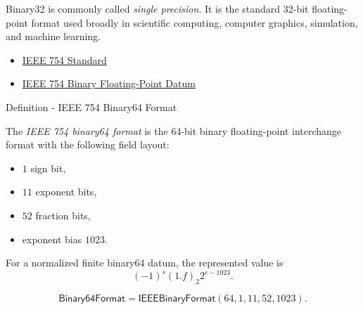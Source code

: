 \begin{remark*}[Interpretation]
Binary32 is commonly called \emph{single precision}. It is the standard 32-bit floating-point
format used broadly in scientific computing, computer graphics, simulation, and machine learning.
\end{remark*}

\begin{remark*}[Exposition]
\end{remark*}

\begin{dependencies}
\begin{itemize}
  \item \hyperref[def:numerical-analysis-ieee-754-standard]{IEEE 754 Standard}
  \item \hyperref[def:numerical-analysis-ieee-754-binary-floating-point-datum]{IEEE 754 Binary Floating-Point Datum}
\end{itemize}
\end{dependencies}


\begin{definitionbox}{Definition - IEEE 754 Binary64 Format}
\begin{definition}
\label{def:numerical-analysis-ieee-754-binary64-format}
The \emph{IEEE 754 binary64 format} is the 64-bit binary floating-point interchange format
with the following field layout:

\begin{itemize}
    \item $1$ sign bit,
    \item $11$ exponent bits,
    \item $52$ fraction bits,
    \item exponent bias $1023$.
\end{itemize}

For a normalized finite binary64 datum, the represented value is
\[
(-1)^s (1.f)_2 2^{e-1023}.
\]
\end{definition}
\end{definitionbox}

\begin{remark*}
\[
\mathsf{Binary64Format}
=\mathsf{IEEEBinaryFormat}(64,1,11,52,1023).
\]
\end{remark*}

